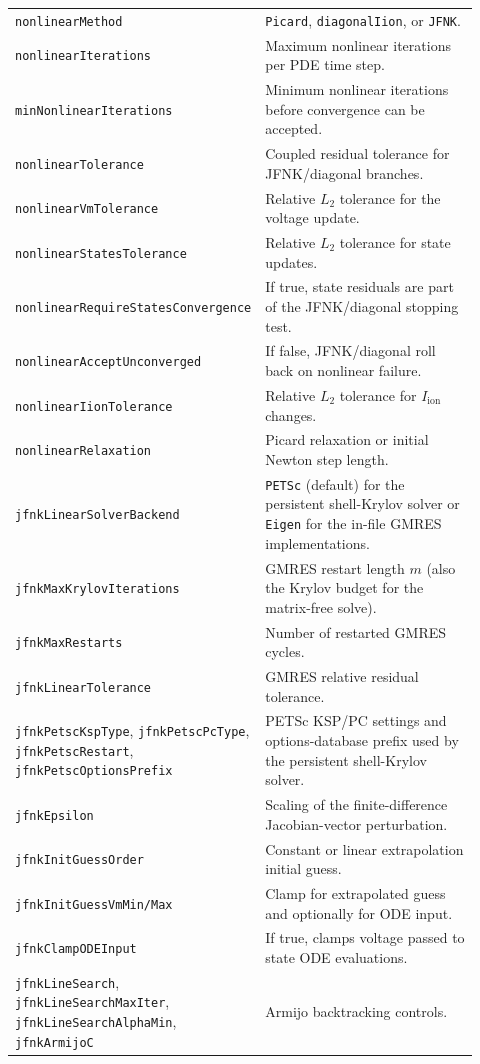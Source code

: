 \documentclass[11pt,a4paper]{article}
\newcommand{\code}[1]{\texttt{\small #1}}
\newcommand{\Iion}{I_{\mathrm{ion}}}
\begin{document}
\begin{longtable}{@{}p{0.34\linewidth}p{0.58\linewidth}@{}}
\code{nonlinearMethod} & \code{Picard}, \code{diagonalIion}, or \code{JFNK}. \\
\code{nonlinearIterations} & Maximum nonlinear iterations per PDE time step. \\
\code{minNonlinearIterations} & Minimum nonlinear iterations before convergence can be accepted. \\
\code{nonlinearTolerance} & Coupled residual tolerance for JFNK/diagonal branches. \\
\code{nonlinearVmTolerance} & Relative $L_2$ tolerance for the voltage update. \\
\code{nonlinearStatesTolerance} & Relative $L_2$ tolerance for state updates. \\
\code{nonlinearRequireStatesConvergence} & If true, state residuals are part of the JFNK/diagonal stopping test. \\
\code{nonlinearAcceptUnconverged} & If false, JFNK/diagonal roll back on nonlinear failure. \\
\code{nonlinearIionTolerance} & Relative $L_2$ tolerance for $\Iion$ changes. \\
\code{nonlinearRelaxation} & Picard relaxation or initial Newton step length. \\
\code{jfnkLinearSolverBackend} & \code{PETSc} (default) for the persistent shell-Krylov solver or \code{Eigen} for the in-file GMRES implementations. \\
\code{jfnkMaxKrylovIterations} & GMRES restart length $m$ (also the Krylov budget for the matrix-free solve). \\
\code{jfnkMaxRestarts} & Number of restarted GMRES cycles. \\
\code{jfnkLinearTolerance} & GMRES relative residual tolerance. \\
\code{jfnkPetscKspType}, \code{jfnkPetscPcType}, \code{jfnkPetscRestart}, \code{jfnkPetscOptionsPrefix} & PETSc KSP/PC settings and options-database prefix used by the persistent shell-Krylov solver. \\
\code{jfnkEpsilon} & Scaling of the finite-difference Jacobian-vector perturbation. \\
\code{jfnkInitGuessOrder} & Constant or linear extrapolation initial guess. \\
\code{jfnkInitGuessVmMin/Max} & Clamp for extrapolated guess and optionally for ODE input. \\
\code{jfnkClampODEInput} & If true, clamps voltage passed to state ODE evaluations. \\
\code{jfnkLineSearch}, \code{jfnkLineSearchMaxIter}, \code{jfnkLineSearchAlphaMin}, \code{jfnkArmijoC} & Armijo backtracking controls. \\

\end{longtable}
\end{document}
